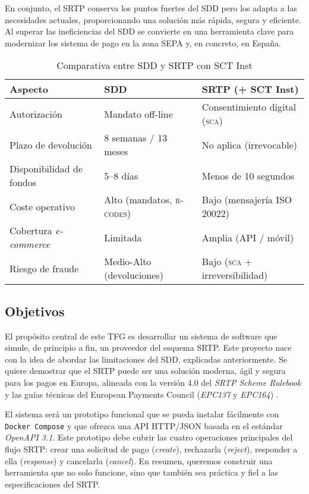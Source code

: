 En conjunto, el SRTP conserva los puntos fuertes del SDD pero los adapta a las necesidades actuales, proporcionando una solución más rápida, segura y eficiente. Al superar las ineficiencias del SDD se convierte en una herramienta clave para modernizar los sistema de pago en la zona SEPA y, en concreto, en España.
\vspace{0.5cm}

\begin{table}[h]
\centering
\caption{Comparativa entre SDD y SRTP con SCT Inst}
\label{tab:comparativa-sdd-srtp}
\renewcommand{\arraystretch}{1.2}
\begin{tabular}{@{}L{4.8cm}C{4.8cm}C{4.8cm}@{}}
\toprule
\textbf{Aspecto} & \textbf{SDD} & \textbf{SRTP (+ SCT Inst)} \\
\midrule
Autorización & Mandato off-line & Consentimiento digital (\textsc{sca}) \\
Plazo de devolución & 8 semanas / 13 meses & No aplica (irrevocable) \\
Disponibilidad de fondos & 5--8 días & Menos de 10 segundos \\
Coste operativo & Alto (mandatos, \textsc{r-codes}) & Bajo (mensajería ISO 20022) \\
Cobertura \emph{e-commerce} & Limitada & Amplia (API / móvil) \\
Riesgo de fraude & Medio-Alto (devoluciones) & Bajo (\textsc{sca} + irreversibilidad) \\
\bottomrule
\end{tabular}
\end{table}

\bigskip


\subsection{Objetivos}
\label{subsec:Objetivos}
El propósito central de este TFG es desarrollar un sistema de software que simule, de principio a fin, un proveedor del esquema SRTP. Este proyecto nace con la idea de abordar las limitaciones del SDD, explicadas anteriormente. Se quiere demostrar que el SRTP puede ser una solución moderna, ágil y segura para los pagos en Europa, alineada con la versión 4.0 del \textit{SRTP Scheme Rulebook} \cite{epc014} y las guías técnicas del European Payments Council (\textit{EPC137} y \textit{EPC164}) \cite{epc137,epc164}.

El sistema será un prototipo funcional que se pueda instalar fácilmente con \texttt{Docker Compose} y que ofrezca una API HTTP/JSON basada en el estándar \textit{OpenAPI 3.1}. Este prototipo debe cubrir las cuatro operaciones principales del flujo SRTP: crear una solicitud de pago (\textit{create}), rechazarla (\textit{reject}), responder a ella (\textit{response}) y cancelarla (\textit{cancel}). En resumen, queremos construir una herramienta que no solo funcione, sino que también sea práctica y fiel a las especificaciones del SRTP.

